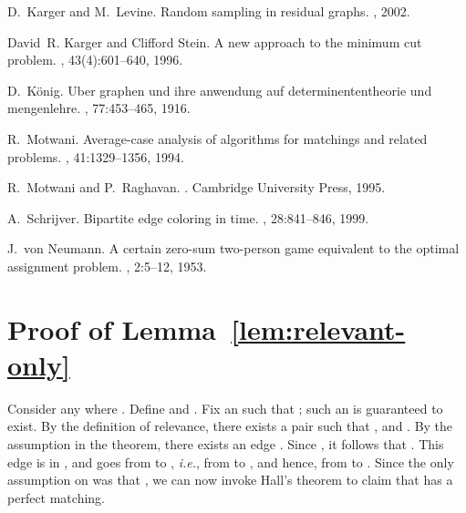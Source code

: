 \documentclass[11pt]{article}
\begin{document}
\begin{thebibliography}{10}
D.~Karger and M.~Levine.
\newblock Random sampling in residual graphs.
, 2002.

David~R. Karger and Clifford Stein.
\newblock A new approach to the minimum cut problem.
, 43(4):601--640, 1996.

D.~K\"{o}nig.
\newblock Uber graphen und ihre anwendung auf determinententheorie und
  mengenlehre.
, 77:453--465, 1916.

R.~Motwani.
\newblock Average-case analysis of algorithms for matchings and related
  problems.
, 41:1329--1356, 1994.

R.~Motwani and P.~Raghavan.
.
\newblock Cambridge University Press, 1995.

A.~Schrijver.
\newblock Bipartite edge coloring in {} time.
, 28:841--846, 1999.

J.~von Neumann.
\newblock A certain zero-sum two-person game equivalent to the optimal
  assignment problem.
, 2:5--12, 1953.

\end{thebibliography}

\appendix

\section{Proof of Lemma~\ref{lem:relevant-only}}
\label{append:relevant-only}
Consider any  where .  Define
 and . Fix an  such that ; such an  is guaranteed to exist. By the definition of relevance,
there exists a pair  such that , and . By the assumption in the theorem,
there exists an edge . Since , it follows that . This edge is in , and goes from  to , {\em i.e.}, from  to , and hence, from  to
. Since the only assumption on  was that , we
can now invoke Hall's theorem to claim that  has a perfect
matching.
\end{document}
